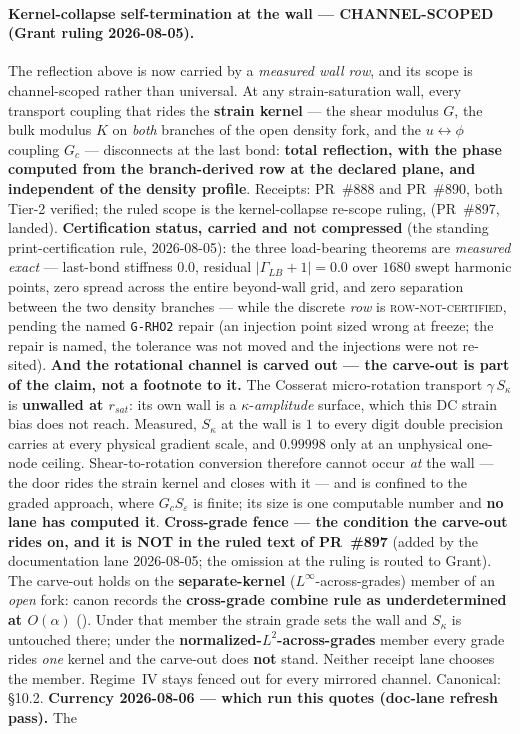 \paragraph{Kernel-collapse self-termination at the wall --- CHANNEL-SCOPED (Grant ruling 2026-08-05).} The reflection above is now carried by a \emph{measured wall row}, and its scope is channel-scoped rather than universal. At any strain-saturation wall, every transport coupling that rides the \textbf{strain kernel} --- the shear modulus $G$, the bulk modulus $K$ on \emph{both} branches of the open density fork, and the $u \leftrightarrow \phi$ coupling $G_c$ --- disconnects at the last bond: \textbf{total reflection, with the phase computed from the branch-derived row at the declared plane, and independent of the density profile}. Receipts: PR~\#888 and PR~\#890, both Tier-2 verified; the ruled scope is the kernel-collapse re-scope ruling,  (PR~\#897, landed). \textbf{Certification status, carried and not compressed} (the standing print-certification rule, 2026-08-05): the three load-bearing theorems are \emph{measured exact} --- last-bond stiffness $0.0$, residual $\lvert\Gamma_{LB}+1\rvert = 0.0$ over $1680$ swept harmonic points, zero spread across the entire beyond-wall grid, and zero separation between the two density branches --- while the discrete \emph{row} is \textsc{row-not-certified}, pending the named \texttt{G-RHO2} repair (an injection point sized wrong at freeze; the repair is named, the tolerance was not moved and the injections were not re-sited). \textbf{And the rotational channel is carved out --- the carve-out is part of the claim, not a footnote to it.} The Cosserat micro-rotation transport $\gamma\,S_\kappa$ is \textbf{unwalled at $r_{sat}$}: its own wall is a $\kappa$-\emph{amplitude} surface, which this DC strain bias does not reach. Measured, $S_\kappa$ at the wall is $1$ to every digit double precision carries at every physical gradient scale, and $0.99998$ only at an unphysical one-node ceiling. Shear-to-rotation conversion therefore cannot occur \emph{at} the wall --- the door rides the strain kernel and closes with it --- and is confined to the graded approach, where $G_c S_\varepsilon$ is finite; its size is one computable number and \textbf{no lane has computed it}. \textbf{Cross-grade fence --- the condition the carve-out rides on, and it is NOT in the ruled text of PR~\#897} (added by the documentation lane 2026-08-05; the omission at the ruling is routed to Grant). The carve-out holds on the \textbf{separate-kernel} ($L^\infty$-across-grades) member of an \emph{open} fork: canon records the \textbf{cross-grade combine rule as underdetermined at $O(\alpha)$} (). Under that member the strain grade sets the wall and $S_\kappa$ is untouched there; under the \textbf{normalized-$L^2$-across-grades} member every grade rides \emph{one} kernel and the carve-out does \textbf{not} stand. Neither receipt lane chooses the member. Regime~IV stays fenced out for every mirrored channel. Canonical:  \S10.2. \textbf{Currency 2026-08-06 --- which run this quotes (doc-lane refresh pass).} The 